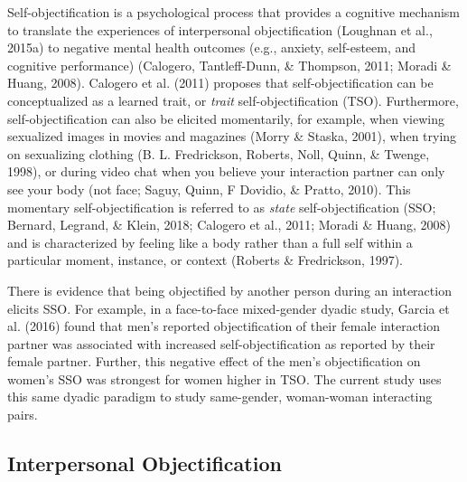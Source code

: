 \documentclass[man]{apa6}
\begin{document}
Self-objectification is a psychological process that provides a
cognitive mechanism to translate the experiences of interpersonal
objectification (Loughnan et al., 2015a) to negative mental health
outcomes (e.g., anxiety, self-esteem, and cognitive performance)
(Calogero, Tantleff-Dunn, \& Thompson, 2011; Moradi \& Huang, 2008).
Calogero et al. (2011) proposes that self-objectification can be
conceptualized as a learned trait, or \emph{trait} self-objectification
(TSO). Furthermore, self-objectification can also be elicited
momentarily, for example, when viewing sexualized images in movies and
magazines (Morry \& Staska, 2001), when trying on sexualizing clothing
(B. L. Fredrickson, Roberts, Noll, Quinn, \& Twenge, 1998), or during
video chat when you believe your interaction partner can only see your
body (not face; Saguy, Quinn, F Dovidio, \& Pratto, 2010). This
momentary self-objectification is referred to as \emph{state}
self-objectification (SSO; Bernard, Legrand, \& Klein, 2018; Calogero et
al., 2011; Moradi \& Huang, 2008) and is characterized by feeling like a
body rather than a full self within a particular moment, instance, or
context (Roberts \& Fredrickson, 1997).

There is evidence that being objectified by another person during an
interaction elicits SSO. For example, in a face-to-face mixed-gender
dyadic study, Garcia et al. (2016) found that men's reported
objectification of their female interaction partner was associated with
increased self-objectification as reported by their female partner.
Further, this negative effect of the men's objectification on women's
SSO was strongest for women higher in TSO. The current study uses this
same dyadic paradigm to study same-gender, woman-woman interacting
pairs.

\subsection{Interpersonal
Objectification}\label{interpersonal-objectification}
\end{document}
